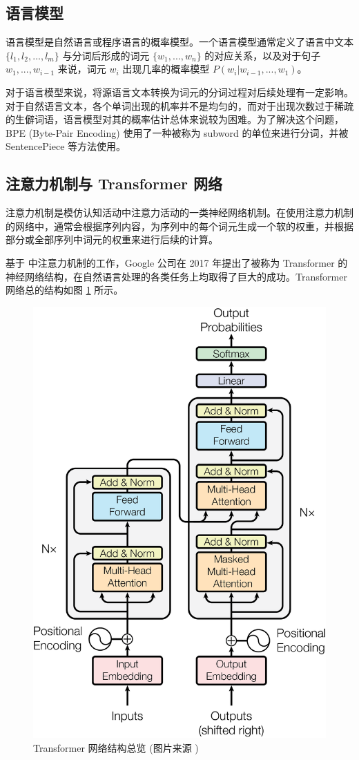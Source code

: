 \subsection{语言模型}

语言模型是自然语言或程序语言的概率模型。一个语言模型通常定义了语言中文本 $\{l_1, l_2, ..., l_m\}$ 与分词后形成的词元 $\{w_1, ..., w_n\}$ 的对应关系，以及对于句子 $ w_1, ..., w_{i-1} $ 来说，词元 $ w_i$ 出现几率的概率模型 $P(w_i|w_{i-1}, ..., w_{1})
$。


对于语言模型来说，将源语言文本转换为词元的分词过程对后续处理有一定影响。对于自然语言文本，各个单词出现的机率并不是均匀的，而对于出现次数过于稀疏的生僻词语，语言模型对其的概率估计总体来说较为困难。为了解决这个问题，BPE (Byte-Pair Encoding) \cite{sennrich-etal-2016-neural} 使用了一种被称为 subword 的单位来进行分词，并被 SentencePiece \cite{kudo-richardson-2018-sentencepiece} 等方法使用。

\subsection{注意力机制与 Transformer 网络}

注意力机制是模仿认知活动中注意力活动的一类神经网络机制。在使用注意力机制的网络中，通常会根据序列内容，为序列中的每个词元生成一个软的权重，并根据部分或全部序列中词元的权重来进行后续的计算。

基于 \citet{bahdanau2016neural} 中注意力机制的工作，Google 公司在 2017 年提出了被称为 Transformer \cite{Vaswani2017AttentionIA} 的神经网络结构，在自然语言处理的各类任务上均取得了巨大的成功。Transformer 网络总的结构如图 \ref{fig:transformer_overview} 所示。

\begin{figure}[h]
  \centering
  \includegraphics[width=0.5\linewidth]{figures/Transformer-Arch.png}
  \caption{Transformer 网络结构总览 (图片来源 \citet{Vaswani2017AttentionIA})}
  \label{fig:transformer_overview}
\end{figure}

